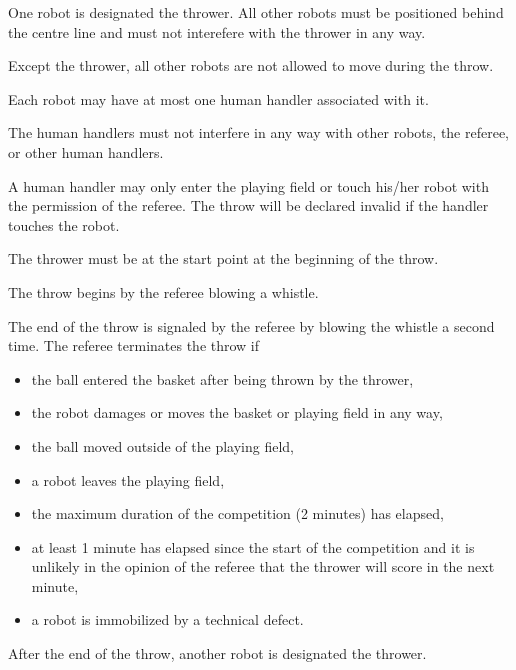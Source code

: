 \documentclass[12pt]{hurocup}
\begin{document}
\begin{lawlist}[BB]

 \item One robot is designated the thrower. All other robots must be
 positioned behind the centre line and must not interefere with the
 thrower in any way.

 \item Except the thrower, all other robots are not allowed to move
 during the throw.

 \item Each robot may have at most one human handler associated with
 it.

 \item \label{bb-handler1} The human handlers must not interfere in
 any way with other robots, the referee, or other human handlers.

 \item \label{bb-handler2} A human handler may only enter the playing
 field or touch his/her robot with the permission of the referee. The
 throw will be declared invalid if the handler touches the robot.

 \item The thrower must be at the start point at the beginning of the
 throw. 

\item The throw begins by the referee blowing a whistle.

\item The end of the throw is signaled by the referee by
  blowing the whistle a second time.
  The referee terminates the throw if
  \begin{itemize}
  \item the ball entered the basket after being thrown by the thrower,
  \item the robot damages or moves the basket or playing field in any way,
  \item the ball moved outside of the playing field,
  \item a robot leaves the playing field,
  \item the maximum duration of the competition (2 minutes) has elapsed,
  \item at least 1 minute has elapsed since the start of the
    competition and it is unlikely in the opinion of the referee that
    the thrower will score in the next minute,
  \item a robot is immobilized by a technical defect.
  \end{itemize}

\item After the end of the throw, another robot is designated the
 thrower. 

\end{lawlist}
\end{document}
